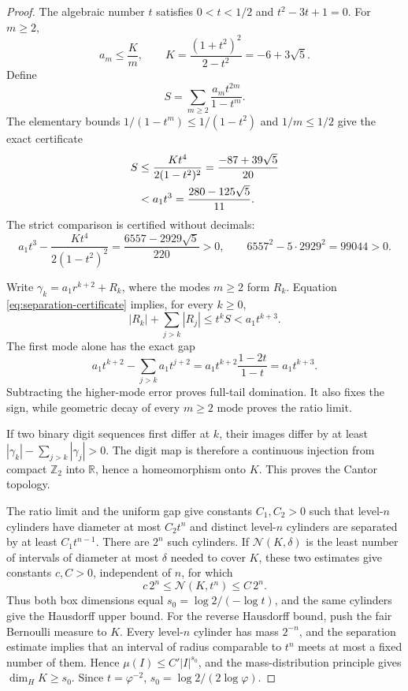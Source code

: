 \begin{proof}
The algebraic number \(t\) satisfies \(0<t<1/2\) and
\(t^2-3t+1=0\).  For \(m\ge2\),
\[
  a_m\le\frac Km,\qquad
  K=\frac{(1+t^2)^2}{2-t^2}=-6+3\sqrt5.
\]
Define
\[
  S=\sum_{m\ge2}\frac{a_mt^{2m}}{1-t^m}.
\]
The elementary bounds \(1/(1-t^m)\le1/(1-t^2)\) and \(1/m\le1/2\)
give the exact certificate
\begin{align}
  S
  &\le \frac{Kt^4}{2(1-t^2)^2}
    =\frac{-87+39\sqrt5}{20} \notag\\
  &<a_1t^3=\frac{280-125\sqrt5}{11}.
  \label{eq:separation-certificate}
\end{align}
The strict comparison is certified without decimals:
\[
  a_1t^3-\frac{Kt^4}{2(1-t^2)^2}
   =\frac{6557-2929\sqrt5}{220}>0,\qquad
  6557^2-5\cdot2929^2=99044>0.
\]

Write \(\gamma_k=a_1r^{k+2}+R_k\), where the modes \(m\ge2\) form
\(R_k\).  Equation \eqref{eq:separation-certificate} implies, for every
\(k\ge0\),
\[
  |R_k|+\sum_{j>k}|R_j|
  \le t^kS<a_1t^{k+3}.
\]
The first mode alone has the exact gap
\[
  a_1t^{k+2}-\sum_{j>k}a_1t^{j+2}
  =a_1t^{k+2}\frac{1-2t}{1-t}
  =a_1t^{k+3}.
\]
Subtracting the higher-mode error proves full-tail domination.  It also
fixes the sign, while geometric decay of every \(m\ge2\) mode proves the
ratio limit.

If two binary digit sequences first differ at \(k\), their images differ by
at least
\(|\gamma_k|-\sum_{j>k}|\gamma_j|>0\).  The digit map is therefore a
continuous injection from compact \(\mathbb Z_2\) into \(\mathbb R\), hence
a homeomorphism onto \(K\).  This proves the Cantor topology.

The ratio limit and the uniform gap give constants \(C_1,C_2>0\) such that
level-\(n\) cylinders have diameter at most \(C_2t^n\) and distinct
level-\(n\) cylinders are separated by at least \(C_1t^{n-1}\).  There are
\(2^n\) such cylinders.  If \(\mathcal N(K,\delta)\) is the least number of
intervals of diameter at most \(\delta\) needed to cover \(K\), these two
estimates give constants \(c,C>0\), independent of \(n\), for which
\[
  c\,2^n\le \mathcal N(K,t^n)\le C\,2^n.
\]
Thus both box dimensions equal \(s_0=\log2/(-\log t)\), and the same
cylinders give the Hausdorff upper bound.  For the reverse Hausdorff bound,
push the fair Bernoulli measure to \(K\).  Every level-\(n\) cylinder has
mass \(2^{-n}\), and the separation estimate implies that an interval of
radius comparable to \(t^n\) meets at most a fixed number of them.  Hence
\(\mu(I)\le C'|I|^{s_0}\), and the mass-distribution principle gives
\(\dim_HK\ge s_0\).  Since \(t=\varphi^{-2}\),
\(s_0=\log2/(2\log\varphi)\).
\end{proof}

